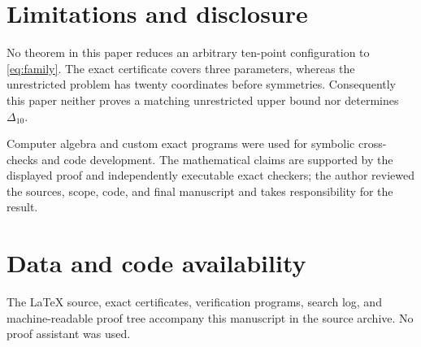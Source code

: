 \documentclass[11pt]{amsart}
\theoremstyle{definition}
\begin{document}
\section{Limitations and disclosure}

No theorem in this paper reduces an arbitrary ten-point configuration to
\eqref{eq:family}.  The exact certificate covers three parameters, whereas the
unrestricted problem has twenty coordinates before symmetries.  Consequently
this paper neither proves a matching unrestricted upper bound nor determines
$\Delta_{10}$.

Computer algebra and custom exact programs were used for symbolic
cross-checks and code development.  The mathematical claims are supported by
the displayed proof and independently executable exact checkers; the author
reviewed the sources, scope, code, and final manuscript and takes
responsibility for the result.

\section*{Data and code availability}

The LaTeX source, exact certificates, verification programs, search log, and
machine-readable proof tree accompany this manuscript in the source archive.
No proof assistant was used.



\end{document}
